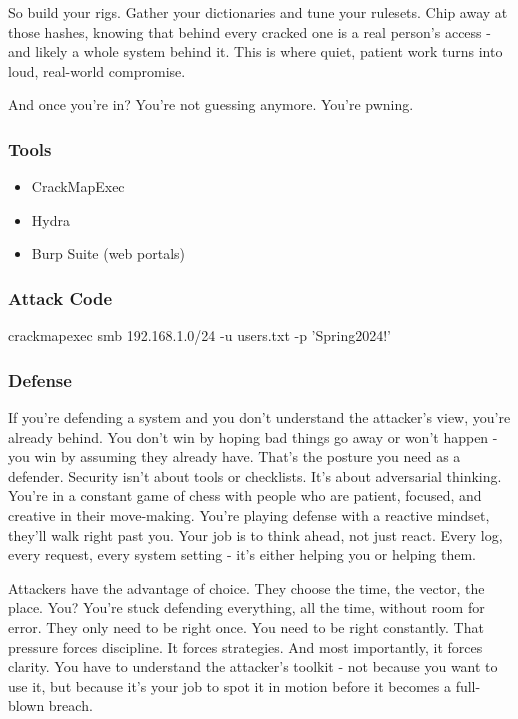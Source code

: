 So build your rigs. Gather your dictionaries and tune your rulesets. Chip away at those hashes, knowing that behind every cracked one is a real person’s access - and likely a whole system behind it. This is where quiet, patient work turns into loud, real-world compromise.

And once you’re in? You’re not guessing anymore. You’re pwning.

\subsubsection{\textbf{Tools}}

\begin{itemize}
    \item CrackMapExec

    \item Hydra

    \item Burp Suite (web portals)

\end{itemize}

\subsubsection{\textbf{Attack Code}}

crackmapexec smb 192.168.1.0/24 -u users.txt -p 'Spring2024!'

\subsubsection{\textbf{Defense}}

If you’re defending a system and you don’t understand the attacker’s view, you’re already behind. You don’t win by hoping bad things go away or won’t happen - you win by assuming they already have. That’s the posture you need as a defender. Security isn’t about tools or checklists. It’s about adversarial thinking. You’re in a constant game of chess with people who are patient, focused, and creative in their move-making. You’re playing defense with a reactive mindset, they’ll walk right past you. Your job is to think ahead, not just react. Every log, every request, every system setting - it’s either helping you or helping them.

Attackers have the advantage of choice. They choose the time, the vector, the place. You? You’re stuck defending everything, all the time, without room for error. They only need to be right once. You need to be right constantly. That pressure forces discipline. It forces strategies. And most importantly, it forces clarity. You have to understand the attacker’s toolkit - not because you want to use it, but because it’s your job to spot it in motion before it becomes a full-blown breach.

